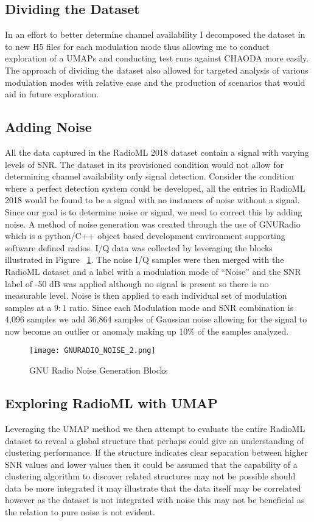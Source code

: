 \documentclass[conference]{IEEEtran}
\begin{document}
\subsection{Dividing the Dataset}
In an effort to better determine channel availability I decomposed the dataset in to new H5 files for each modulation mode thus allowing me to conduct exploration of a UMAPs and conducting test runs against CHAODA more easily. The approach of dividing the dataset also allowed for targeted analysis of various modulation modes with relative ease and the production of scenarios that would aid in future exploration.

\subsection{Adding Noise}
All the data captured in the RadioML 2018 dataset contain a signal with varying levels of SNR.  The dataset in its provisioned condition would not allow for determining channel availability only signal detection. Consider the condition where a perfect detection system could be developed, all the entries in RadioML 2018 would be found to be a signal with no instances of noise without a signal. Since our goal is to determine noise or signal, we need to correct this by adding noise. A method of noise generation was created through the use of GNURadio \cite{b8} which is a python/C++ object based development environment supporting software defined radios.  I/Q data was collected by leveraging the blocks illustrated in Figure ~\ref{GNURADIO}. The noise I/Q samples were then merged with the RadioML dataset and a label with a modulation mode of “Noise” and the SNR label of -50  dB was applied although no signal is present so there is no measurable level. Noise is then applied to each individual set of modulation samples at a $9:1$ ratio. Since each Modulation mode and SNR combination is 4,096 samples we add 36,864 samples of Gaussian noise allowing for the signal to now become an outlier or anomaly making up 10\% of the samples analyzed.

\begin{figure}
\centering
\texttt{[image: GNURADIO\_NOISE\_2.png]}
\caption{GNU Radio Noise Generation Blocks}
\label{GNURADIO}
\end{figure}

\subsection{Exploring RadioML with UMAP}
Leveraging the UMAP method we then attempt to evaluate the entire RadioML dataset to reveal a global structure that perhaps could give an understanding of clustering performance.  If the structure indicates clear separation between higher SNR values and lower values then it could be assumed that the capability of a clustering algorithm to discover related structures may not be possible should data be more integrated it may illustrate that the data itself may be correlated however as the dataset is not integrated with noise this may not be beneficial as the relation to pure noise is not evident. 
\end{document}

